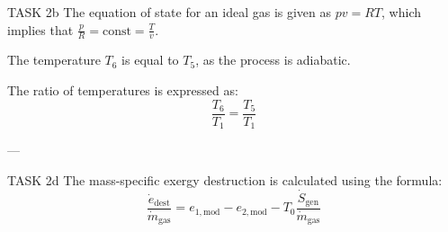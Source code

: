 TASK 2b  
The equation of state for an ideal gas is given as \( p v = R T \), which implies that \( \frac{p}{R} = \text{const} = \frac{T}{v} \).  

The temperature \( T_6 \) is equal to \( T_5 \), as the process is adiabatic.  

The ratio of temperatures is expressed as:  
\[
\frac{T_6}{T_1} = \frac{T_5}{T_1}
\]

---

TASK 2d  
The mass-specific exergy destruction is calculated using the formula:  
\[
\frac{\dot{e}_{\text{dest}}}{\dot{m}_{\text{gas}}} = e_{1,\text{mod}} - e_{2,\text{mod}} - T_0 \frac{\dot{S}_{\text{gen}}}{\dot{m}_{\text{gas}}}
\]